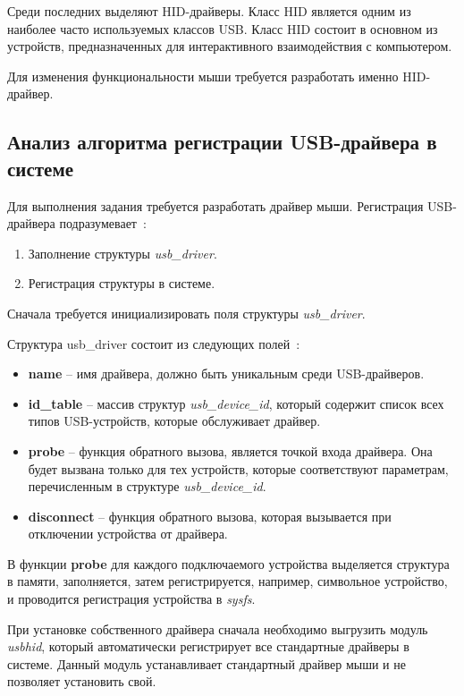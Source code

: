 Среди последних выделяют HID-драйверы. 
Класс HID является одним из наиболее часто используемых классов USB. 
Класс HID состоит в основном из устройств, предназначенных для интерактивного взаимодействия с компьютером. 

Для изменения функциональности мыши требуется разработать именно HID-драйвер.

\subsection{Анализ алгоритма регистрации USB-драйвера в системе}
Для выполнения задания требуется разработать драйвер мыши. Регистрация USB-драйвера подразумевает~\cite{usb_drivers}:
\begin{enumerate}
	\item Заполнение структуры \textit{usb\_driver}.
	\item Регистрация структуры в системе.
\end{enumerate}

Сначала требуется инициализировать поля структуры \textit{usb\_driver}. 

Структура usb\_driver состоит из следующих полей~\cite{usb_driver}:
\begin{itemize}[label=---]
	\item \textbf{name} -- имя драйвера, должно быть уникальным среди USB-драйверов.
	\item \textbf{id\_table} -- массив структур \textit{usb\_device\_id}, который содержит список всех типов USB-устройств, которые обслуживает драйвер.
	\item \textbf{probe} -- функция обратного вызова, является точкой входа драйвера. Она будет вызвана только для тех устройств, которые соответствуют параметрам, перечисленным в структуре \textit{usb\_device\_id}.
	\item \textbf{disconnect} -- функция обратного вызова, которая вызывается при отключении устройства от драйвера.
\end{itemize}

В функции \textbf{probe} для каждого подключаемого устройства выделяется структура в памяти, заполняется, затем регистрируется, например, символьное устройство, и проводится регистрация устройства в \textit{sysfs}.

При установке собственного драйвера сначала необходимо выгрузить модуль \textit{usbhid}, который автоматически регистрирует все стандартные драйверы в системе.
Данный модуль устанавливает стандартный драйвер мыши и не позволяет установить свой.

